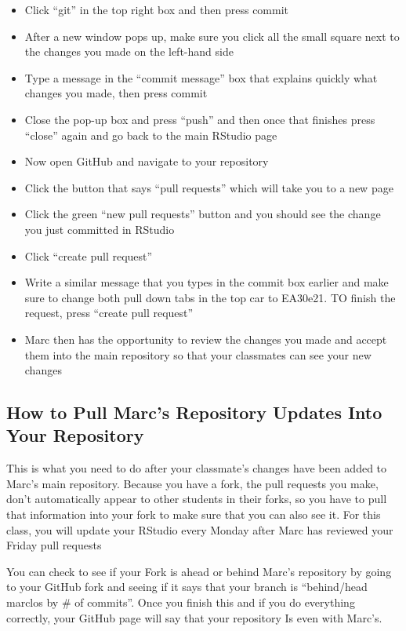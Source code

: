 \documentclass[12pt]{../SOP4_alpha}
\begin{document}
\begin{itemize}

\item Click ``git'' in the top right box and then press commit
  \item After a new window pops up, make sure you click all the small square next to the changes you made on the left-hand side 
\item Type a message in the ``commit message'' box that explains quickly what changes you made, then press commit
  \item Close the pop-up box and press ``push'' and then once that finishes press ``close'' again and go back to the main RStudio page
\item Now open GitHub and navigate to your repository 
  \item Click the button that says ``pull requests'' which will take you to a new page
  \item Click the green ``new pull requests'' button and you should see the change you just committed in RStudio
  \item Click ``create pull request''
  \item Write a similar message that you types in the commit box earlier and make sure to change both pull down tabs in the top car to EA30e21. TO finish the request, press ``create pull request'' 
  \item Marc then has the opportunity to review the changes you made and accept them into the main repository so that your classmates can see your new changes

\end{itemize}


\subsection{How to Pull Marc's Repository Updates Into Your Repository}

This is what you need to do after your classmate's changes have been added to Marc's main repository. Because you have a fork, the pull requests you make, don't automatically appear to other students in their forks, so you have to pull that information into your fork to make sure that you can also see it. For this class, you will update your RStudio every Monday after Marc has reviewed your Friday pull requests

You can check to see if your Fork is ahead or behind Marc's repository by going to your GitHub fork and seeing if it says that your branch is ``behind/head marclos by \# of commits''. Once you finish this and if you do everything correctly, your GitHub page will say that your repository Is even with Marc's. 
\end{document}
